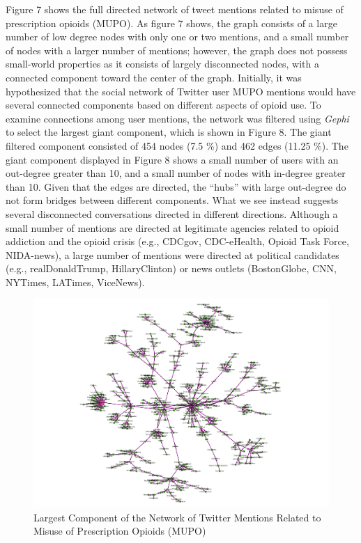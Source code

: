 \documentclass[sigconf]{acmart}
\begin{document}
Figure 7 shows the full directed network of tweet mentions related to misuse
of prescription opioids (MUPO). As figure 7 shows, the graph consists of a 
large number of low degree nodes with only one or two mentions, and a small 
number of nodes with a larger number of mentions; however, the graph does 
not possess small-world properties as it consists of largely disconnected 
nodes, with a connected component toward the center of the graph. Initially, 
it was hypothesized that the social network of Twitter user MUPO mentions 
would have several connected components based on different aspects of opioid use.  
To examine connections among user mentions, the network was filtered using
\emph{Gephi} to select the largest giant component, which is shown in Figure 8. 
The giant filtered component consisted of 454 nodes (7.5 \%) and 462 edges 
(11.25 \%). The giant component displayed in Figure 8 shows a small number of 
users with an out-degree greater than 10, and a small number of nodes with 
in-degree greater than 10. Given that the edges are directed, the ``hubs'' with 
large out-degree do not form bridges between different components. What we
see instead suggests several disconnected conversations directed in different
directions. Although a small number of mentions are directed at legitimate 
agencies related to opioid addiction and the opioid crisis (e.g., CDCgov, 
CDC-eHealth, Opioid Task Force, NIDA-news), a large number of mentions were 
directed at political candidates (e.g., realDonaldTrump, HillaryClinton) or
news outlets (BostonGlobe, CNN, NYTimes, LATimes, ViceNews). 

\begin{figure}[!ht]
  \centering\includegraphics[width=\columnwidth]{images/Figure8.pdf}
  \caption{Largest Component of the Network of Twitter Mentions Related to 
  Misuse of Prescription Opioids (MUPO)}
  \label{f:Figure8}
\end{figure}
\end{document}
